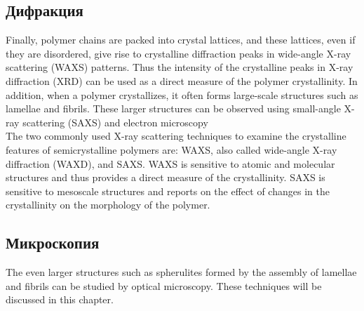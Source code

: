 \subsection{Дифракция}
Finally, polymer chains are packed into crystal lattices, and these lattices, even if they
are disordered, give rise to crystalline diffraction peaks in wide-angle X-ray scattering
(WAXS) patterns. Thus the intensity of the crystalline peaks in X-ray diffraction
(XRD) can be used as a direct measure of the polymer crystallinity. In addition,
when a polymer crystallizes, it often forms large-scale structures such as lamellae
and fibrils. These larger structures can be observed using small-angle X-ray scattering
(SAXS) and electron microscopy\\
The two commonly used X-ray scattering techniques to examine the crystalline
features of semicrystalline polymers are: WAXS, also called wide-angle X-ray
diffraction (WAXD), and SAXS. WAXS is sensitive to atomic and molecular structures
and thus provides a direct measure of the crystallinity. SAXS is sensitive to
mesoscale structures and reports on the effect of changes in the crystallinity on
the morphology of the polymer.\\

\subsection{Микроскопия}
The even larger structures such as spherulites
formed by the assembly of lamellae and fibrils can be studied by optical microscopy.
These techniques will be discussed in this chapter.

